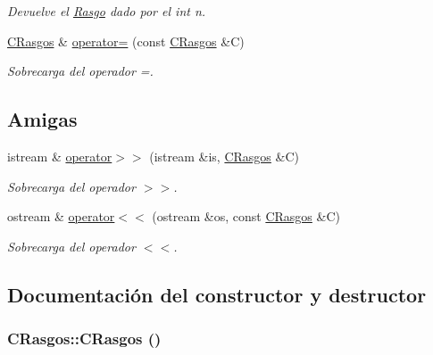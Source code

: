 \begin{CompactItemize}
\begin{CompactList}\small\item\em Devuelve el \hyperlink{class_rasgo}{Rasgo} dado por el int n. \item\end{CompactList}\item 
\hyperlink{class_c_rasgos}{CRasgos} \& \hyperlink{class_c_rasgos_8783aed7d3c09e9f503b48efc84f3102}{operator=} (const \hyperlink{class_c_rasgos}{CRasgos} \&C)
\begin{CompactList}\small\item\em Sobrecarga del operador =. \item\end{CompactList}\end{CompactItemize}
\subsection*{Amigas}
\begin{CompactItemize}
\item 
istream \& \hyperlink{class_c_rasgos_b75cef1ff62ead35759d2993921b695d}{operator$>$$>$} (istream \&is, \hyperlink{class_c_rasgos}{CRasgos} \&C)
\begin{CompactList}\small\item\em Sobrecarga del operador $>$$>$. \item\end{CompactList}\item 
ostream \& \hyperlink{class_c_rasgos_1ecae6e3da0974de7223e11adedcec37}{operator$<$$<$} (ostream \&os, const \hyperlink{class_c_rasgos}{CRasgos} \&C)
\begin{CompactList}\small\item\em Sobrecarga del operador $<$$<$. \item\end{CompactList}\end{CompactItemize}


\subsection{Documentación del constructor y destructor}
\hypertarget{class_c_rasgos_f4ddb3b5ae04a6c3cc7696f01c508823}{
\subsubsection[{CRasgos}]{\setlength{\rightskip}{0pt plus 5cm}CRasgos::CRasgos ()}}
\label{class_c_rasgos_f4ddb3b5ae04a6c3cc7696f01c508823}


